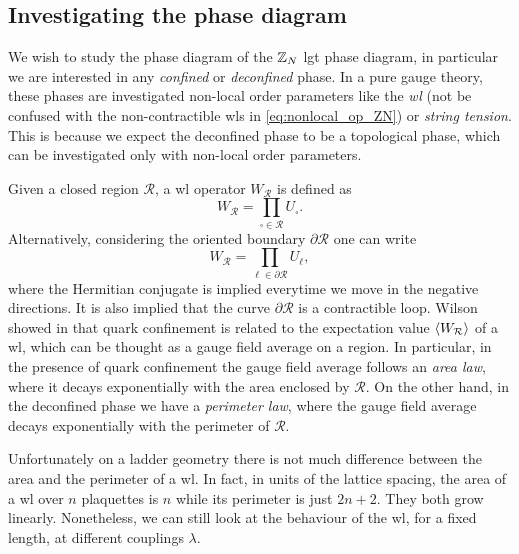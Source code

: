 \subsection{Investigating the phase diagram}%
\label{sub:investigating_the_phase_diagram}

We wish to study the phase diagram of the $\mathbb{Z}_N$ \ac{lgt} phase diagram, in particular we are interested in any \emph{confined} or \emph{deconfined} phase.
In a pure gauge theory, these phases are investigated non-local order parameters like the \emph{\ac{wl}} (not be confused with the non-contractible \ac{wl}s in \eqref{eq:nonlocal_op_ZN}) or \emph{string tension}.
This is because we expect the deconfined phase to be a topological phase, which can be investigated only with non-local order parameters.

Given a closed region $\mathcal{R}$, a \ac{wl} operator $W_{\mathcal{R}}$ is defined as
\begin{equation}
    W_{\mathcal{R}} = \prod_{\square \in \mathcal{R}} U_{\square}.
    \label{eq:closed_wilson_loop}
\end{equation}
Alternatively, considering the oriented boundary $\partial \mathcal{R}$ one can write
\begin{equation}
    W_{\mathcal{R}} = \prod_{\ell \in \partial \mathcal{R}} U_{\ell},
\end{equation}
where the Hermitian conjugate is implied everytime we move in the negative directions.
It is also implied that the curve $\partial \mathcal{R}$ is a contractible loop.
Wilson showed in \cite{wilson1974confinement} that quark confinement is related to the expectation value $\ev{W_{\mathcal{R}}}$ of a \ac{wl}, which can be thought as a gauge field average on a region.
In particular, in the presence of quark confinement the gauge field average follows an \emph{area law}, where it decays exponentially with the area enclosed by $\mathcal{R}$.
On the other hand, in the deconfined phase we have a \emph{perimeter law}, where the gauge field average decays exponentially with the perimeter of $\mathcal{R}$.

Unfortunately on a ladder geometry there is not much difference between the area and the perimeter of a \ac{wl}.
In fact, in units of the lattice spacing, the area of a \ac{wl} over $n$ plaquettes is $n$ while its perimeter is just $2n+2$.
They both grow linearly.
Nonetheless, we can still look at the behaviour of the \ac{wl}, for a fixed length, at different couplings $\lambda$.

